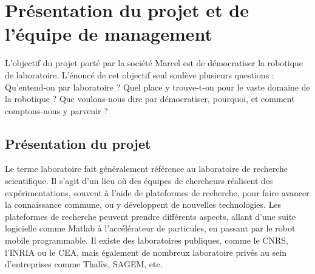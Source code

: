 \documentclass[a4paper,12pt]{report}
\begin{document}




\section{Présentation du projet et de l'équipe de management}

L'objectif du projet porté par la société Marcel est de démocratiser la robotique de laboratoire.
L'énoncé de cet objectif seul soulève plusieurs questions : Qu'entend-on par laboratoire ? Quel place y trouve-t-on pour le vaste domaine de la robotique ?
Que voulons-nous dire par démocratiser, pourquoi, et comment comptons-nous y parvenir ?\\

\subsection{Présentation du projet}

Le terme laboratoire fait généralement référence au laboratoire de recherche scientifique.
Il s'agit d'un lieu où des équipes de chercheurs réalisent des expérimentations, souvent à l'aide de plateformes de recherche,
pour faire avancer la connaissance commune, ou y développent de nouvelles technologies.
Les plateformes de recherche peuvent prendre différents aspects, allant d'une suite logicielle comme Matlab à l'accélérateur de particules, en passant par le robot mobile programmable.
Il existe des laboratoires publiques, comme le CNRS, l'INRIA ou le CEA, mais également de nombreux laboratoire privés au sein d'entreprises comme Thalès, SAGEM, etc.
\end{document}
